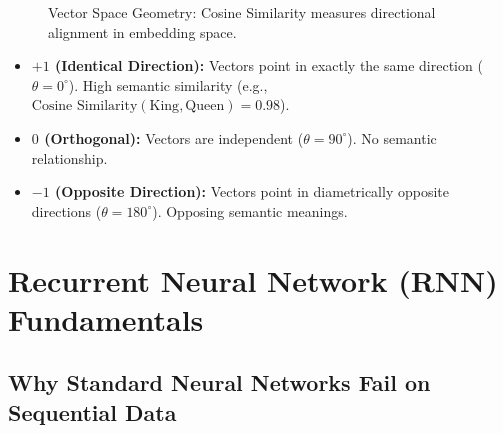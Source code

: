 \begin{figure}[htbp]
\centering
{}
\caption{Vector Space Geometry: Cosine Similarity measures directional alignment in embedding space.}
\label{fig:cosine_geometry_ch3}
\end{figure}

\begin{propertybox}
\begin{itemize}
    \item \textbf{$+1$ (Identical Direction):} Vectors point in exactly the same direction ($\theta = 0^\circ$). High semantic similarity (e.g., $\text{Cosine Similarity}(\text{King}, \text{Queen}) = 0.98$).
    \item \textbf{$0$ (Orthogonal):} Vectors are independent ($\theta = 90^\circ$). No semantic relationship.
    \item \textbf{$-1$ (Opposite Direction):} Vectors point in diametrically opposite directions ($\theta = 180^\circ$). Opposing semantic meanings.
\end{itemize}
\end{propertybox}

\section{Recurrent Neural Network (RNN) Fundamentals}

\subsection{Why Standard Neural Networks Fail on Sequential Data}

